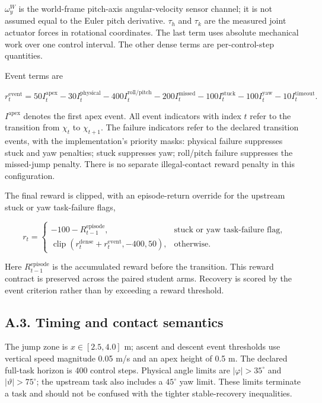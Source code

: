\documentclass[
  american,
  11pt,
  a4paper,
]{article}
\begin{document}
\(\omega_y^W\) is the world-frame pitch-axis angular-velocity sensor
channel; it is not assumed equal to the Euler pitch derivative.
\(\tau_h\) and \(\tau_k\) are the measured joint actuator forces in
rotational coordinates. The last term uses absolute mechanical work over
one control interval. The other dense terms are per-control-step
quantities.

Event terms are

\[
r_t^{\mathrm{event}}=
50I_t^{\mathrm{apex}}-30I_t^{\mathrm{physical}}
-400I_t^{\mathrm{roll/pitch}}-200I_t^{\mathrm{missed}}
-100I_t^{\mathrm{stuck}}-100I_t^{\mathrm{yaw}}-10I_t^{\mathrm{timeout}}.
\tag{51}\label{eq:51}
\]

\(I^{\mathrm{apex}}\) denotes the first apex event. All event indicators
with index \(t\) refer to the transition from \(\chi_t\) to
\(\chi_{t+1}\). The failure indicators refer to the declared transition
events, with the implementation's priority masks: physical failure
suppresses stuck and yaw penalties; stuck suppresses yaw; roll/pitch
failure suppresses the missed-jump penalty. There is no separate
illegal-contact reward penalty in this configuration.

The final reward is clipped, with an episode-return override for the
upstream stuck or yaw task-failure flags,

\[
r_t=
\begin{cases}
-100-R_{t-1}^{\mathrm{episode}},&\text{stuck or yaw task-failure flag},\\
\operatorname{clip}(r_t^{\mathrm{dense}}+r_t^{\mathrm{event}},-400,50),&\text{otherwise}.
\end{cases}
\tag{52}\label{eq:52}
\]

Here \(R_{t-1}^{\mathrm{episode}}\) is the accumulated reward before the
transition. This reward contract is preserved across the paired student
arms. Recovery is scored by the event criterion rather than by exceeding
a reward threshold.

\subsection{A.3. Timing and contact
semantics}\label{a.3.-timing-and-contact-semantics}

The jump zone is \(x\in[2.5,4.0]\) m; ascent and descent event
thresholds use vertical speed magnitude 0.05 m/s and an apex height of
0.5 m. The declared full-task horizon is 400 control steps. Physical
angle limits are \(|\varphi|>35^\circ\) and \(|\vartheta|>75^\circ\);
the upstream task also includes a \(45^\circ\) yaw limit. These limits
terminate a task and should not be confused with the tighter
stable-recovery inequalities.
\end{document}
